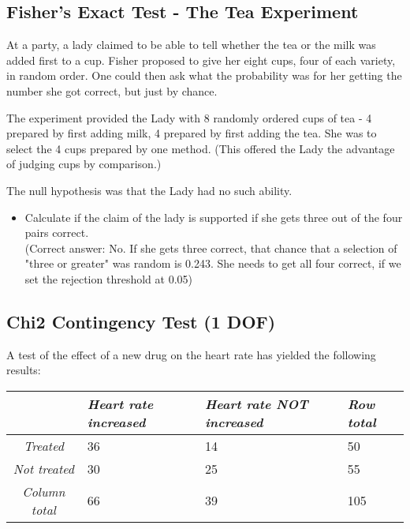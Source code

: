 \subsection*{Fisher's Exact Test - The Tea Experiment}

At a party, a lady claimed to be able to tell whether the tea or the milk was added first to a cup. Fisher proposed to give her eight cups, four of each variety, in random order. One could then ask what the probability was for her getting the number she got correct, but just by chance.

The experiment provided the Lady with 8 randomly ordered cups of tea - 4 prepared by first adding milk, 4 prepared by first adding the tea. She was to select the 4 cups prepared by one method. (This offered the Lady the advantage of judging cups by comparison.)

The null hypothesis was that the Lady had no such ability.

\begin{itemize}
  \item Calculate if the claim of the lady is supported if she gets three out of the four pairs correct.\\
  (Correct answer: No. If she gets three correct, that chance that a selection of "three or greater" was random is 0.243. She needs to get all four correct, if we set the rejection threshold at 0.05)

\end{itemize}


\subsection*{Chi2 Contingency Test (1 DOF)}

A test of the effect of a new drug on the heart rate has yielded the following results:

\begin{table}[h]
  \centering
  \begin{tabular}{|c|l l | l|}
  \hline
  & \emph{Heart rate increased} & \emph{Heart rate NOT increased} & \emph{Row total} \\
  \hline
  \emph{Treated} & 36 & 14 & 50 \\
  \emph{Not treated} & 30 & 25 & 55 \\
  \hline
  \emph{Column total} & 66 & 39 & 105 \\
  \hline
  \end{tabular}
\end{table}

